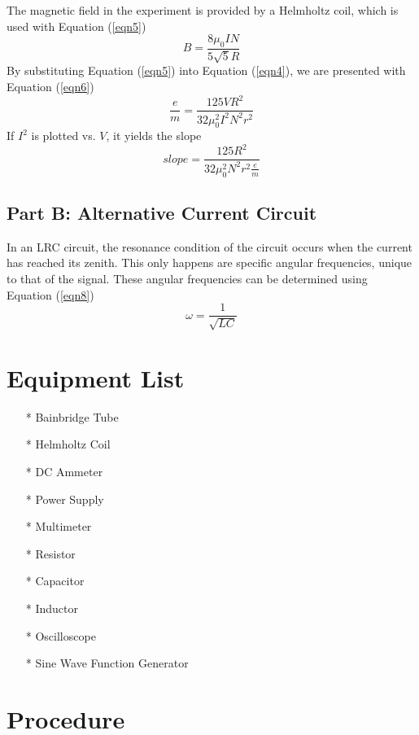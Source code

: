 \documentclass[titlepage]{article}
\begin{document}
The magnetic field in the experiment is provided by a Helmholtz coil, which is used with Equation (\ref{eqn5})
\begin{equation}\label{eqn5}
	B = \frac{8 \mu_0 IN}{5\sqrt{5}R}
\end{equation}
By substituting Equation (\ref{eqn5}) into Equation (\ref{eqn4}), we are presented with Equation (\ref{eqn6})
\begin{equation}\label{eqn6}
	\frac{e}{m} = \frac{125 V R^2}{32 \mu_0^2 I^2 N^2 r^2}
\end{equation}
If $I^2$ is plotted vs. $V$, it yields the slope
\begin{equation}\label{eqn7}
	slope = \frac{125 R^2}{32 \mu_0^2 N^2 r^2 \frac{e}{m}}
\end{equation}

\subsection{Part B: Alternative Current Circuit}\label{sub:part_b_alternative_current_circuit-th}
In an LRC circuit, the resonance condition of the circuit occurs when the current has reached its zenith. This only happens are specific angular frequencies, unique to that of the signal. These angular frequencies can be determined using Equation (\ref{eqn8})
\begin{equation}\label{eqn8}
	\omega = \frac{1}{\sqrt{LC}}
\end{equation}

\section{Equipment List}\label{sec:equipment_list}
\begin{itemize}
\item[*] Bainbridge Tube
\item[*] Helmholtz Coil
\item[*] DC Ammeter
\item[*] Power Supply
\item[*] Multimeter
\item[*] Resistor
\item[*] Capacitor
\item[*] Inductor
\item[*] Oscilloscope
\item[*] Sine Wave Function Generator
\end{itemize}

\section{Procedure}\label{sec:procedure}
\end{document}
